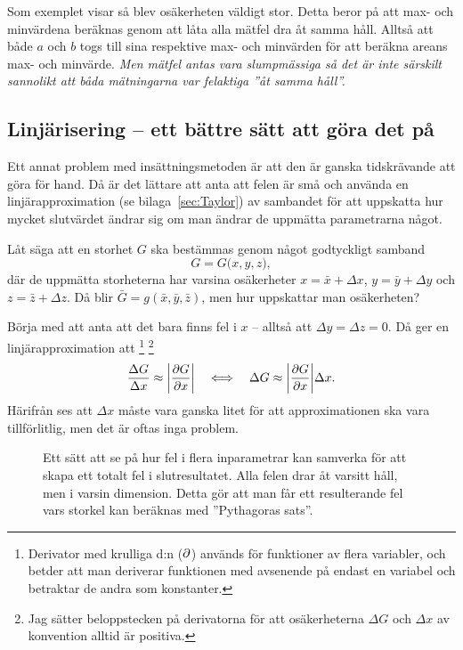 \documentclass[11pt,a4paper, swedish
]{article}
\begin{document}
Som exemplet visar så blev osäkerheten väldigt stor. Detta beror på
att max- och minvärdena beräknas genom att låta alla mätfel dra åt
samma håll. Alltså att både $a$ och $b$ togs till sina respektive max-
och minvärden för att beräkna areans max- och minvärde. 
\emph{Men mätfel antas vara slumpmässiga så det är inte särskilt sannolikt
att båda mätningarna var felaktiga ''åt samma håll''. }

\subsection{Linjärisering -- ett bättre sätt att göra det på}
Ett annat problem med insättningsmetoden är att den är ganska tidskrävande
att göra för hand. Då är det lättare att anta att felen är små och
använda en linjärapproximation (se bilaga~\ref{sec:Taylor}) av
sambandet för att uppskatta hur mycket slutvärdet ändrar sig om man
ändrar de uppmätta parametrarna något.

Låt säga att en storhet $G$ ska bestämmas genom något godtyckligt
samband 
\begin{equation}\label{eq:some_function}
G=G\big(x, y, z \big),
\end{equation}
där de uppmätta storheterna har varsina osäkerheter
$x=\bar{x}+\Delta{x}$, $y=\bar{y}+\Delta{y}$ och
$z=\bar{z}+\Delta{z}$. Då blir $\bar{G}=g(\bar{x}, \bar{y}, \bar{z})$,
men hur uppskattar man osäkerheten?

Börja med att anta att det bara finns fel i $x$ -- alltså att
$\Delta{y}=\Delta{z}=0$. Då ger en linjärapproximation att
\footnote{Derivator med krulliga d:n ($\partial$) används för funktioner av
  flera variabler, och betder att man deriverar funktionen med
  avsenende på endast en variabel och betraktar de andra som
  konstanter.}
\footnote{Jag sätter beloppstecken på derivatorna för att
  osäkerheterna $\Delta{G}$ och $\Delta{x}$ av konvention alltid är
  positiva.} 
\begin{equation}\label{eq:error_one_variable}
\frac{\Delta{G}}{\Delta{x}} \approx \abs{ \pdv{G}{x} } 
\quad\Longleftrightarrow\quad
\Delta{G} \approx \abs{ \pdv{G}{x} } \Delta{x}.
\end{equation}
Härifrån ses att $\Delta{x}$ måste vara ganska litet för att
approximationen ska vara tillförlitlig, men det är oftas inga problem. 


\begin{figure}
\centering

\caption{Ett sätt att se på hur fel i flera inparametrar kan samverka
  för att skapa ett totalt fel i slutresultatet. Alla felen drar åt
  varsitt håll, men i varsin dimension. Detta gör att man får ett
  resulterande fel vars storkel kan beräknas med ''Pythagoras sats''.}
\label{fig:3D}
\end{figure}
\end{document}
